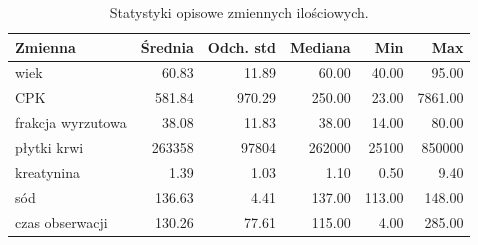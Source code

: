 \begin{table}[htbp]
\centering
\caption{Statystyki opisowe zmiennych ilościowych.}
\label{tab:opisowe}
\scriptsize
\setlength{\tabcolsep}{2.4pt}
\begin{tabular*}{.98\linewidth}{@{\extracolsep{\fill}}lrrrrr}
\toprule
Zmienna & Średnia & Odch. std & Mediana & Min & Max \\
\midrule
wiek & 60.83 & 11.89 & 60.00 & 40.00 & 95.00 \\
CPK & 581.84 & 970.29 & 250.00 & 23.00 & 7861.00 \\
frakcja wyrzutowa & 38.08 & 11.83 & 38.00 & 14.00 & 80.00 \\
płytki krwi & 263358 & 97804 & 262000 & 25100 & 850000 \\
kreatynina & 1.39 & 1.03 & 1.10 & 0.50 & 9.40 \\
sód & 136.63 & 4.41 & 137.00 & 113.00 & 148.00 \\
czas obserwacji & 130.26 & 77.61 & 115.00 & 4.00 & 285.00 \\
\bottomrule
\end{tabular*}
\end{table}
